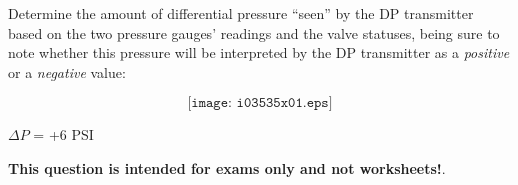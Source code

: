 

Determine the amount of differential pressure ``seen'' by the DP transmitter based on the two pressure gauges' readings and the valve statuses, being sure to note whether this pressure will be interpreted by the DP transmitter as a {\it positive} or a {\it negative} value:

$$\texttt{[image: i03535x01.eps]}$$







$\Delta P$ = +6 PSI







{\bf This question is intended for exams only and not worksheets!}.



